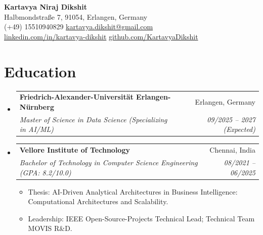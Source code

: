 \documentclass[a4paper,10pt]{article}
\makeatletter
\newcommand{\resumeItem}[1]{
  \item\small{#1}
}
\newcommand{\resumeItemListStart}{\begin{itemize}[leftmargin=0.2in]}
\newcommand{\resumeItemListEnd}{\end{itemize}\vspace{-5pt}}
\newcommand{\resumeSubheading}[4]{
  \vspace{-1pt}\item
    \begin{tabular*}{0.97\textwidth}[t]{l@{\extracolsep{\fill}}r}
      \textbf{#1} & #2 \\
      \textit{\small#3} & \textit{\small #4} \\
    \end{tabular*}\vspace{-5pt}
}
\makeatother
\begin{document}
\begin{center}
    {\huge \textbf{\color{primarycolor} Kartavya Niraj Dikshit}} \\ \vspace{5pt}
    \small
    \faMapMarker* Halbmondstraße 7, 91054, Erlangen, Germany \\
    \faPhone* (+49) 15510940829 \quad \faEnvelope* \href{mailto:kartavya.dikshit@gmail.com}{kartavya.dikshit@gmail.com} \\
    \faLinkedin \href{http://www.linkedin.com/in/kartavya-dikshit}{linkedin.com/in/kartavya-dikshit} \quad \faGithub \href{https://github.com/KartavyaDikshit}{github.com/KartavyaDikshit}
\end{center}

\section{Education}
\begin{itemize}[leftmargin=0.15in, label={}]
    \resumeSubheading
      {Friedrich-Alexander-Universität Erlangen-Nürnberg}{Erlangen, Germany}
      {Master of Science in Data Science (Specializing in AI/ML)}{09/2025 -- 2027 (Expected)}
    \resumeSubheading
      {Vellore Institute of Technology}{Chennai, India}
      {Bachelor of Technology in Computer Science Engineering (GPA: 8.2/10.0)}{08/2021 -- 06/2025}
      \resumeItemListStart
        \resumeItem{Thesis: AI-Driven Analytical Architectures in Business Intelligence: Computational Architectures and Scalability.}
        \resumeItem{Leadership: IEEE Open-Source-Projects Technical Lead; Technical Team MOVIS R\&D.}
      \resumeItemListEnd
\end{itemize}

\end{document}
